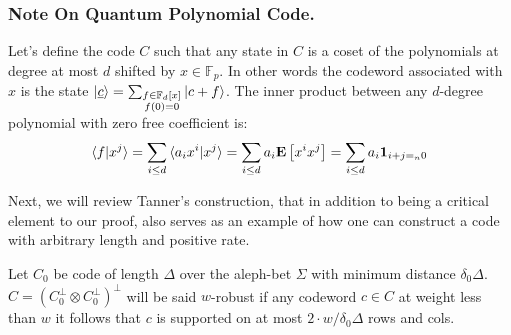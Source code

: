 \documentclass[manuscript,screen,review]{acmart}
\begin{document}
\subsubsection{Note On Quantum Polynomial Code.} 
Let's define the code $C$ such that any state in $C$ is a coset of the polynomials at degree at most $d$ shifted by $x \in \mathbb{F}_{p}$. In other words the codeword associated with $x$ is the state $\ket{\underline{c}} = \sum_{ \substack{ f \in \mathbb{F}_{d}[x] \\  f(0) = 0}}{ \ket{ c + f}} $. The inner product between any $d$-degree polynomial with zero free coefficient is:
\begin{equation*}
  \begin{split}
    \braket{ f | x^{j} } = \sum_{i \le d }{ \braket{a_{i} x^{i} | x^{j}}} = \sum_{i \le d}{ a_{i} \mathbf{E} \left[ { x^{i}x^{j}   } \right]} =  \sum_{i \le d}{ a_{i } \mathbf{1}_{ i + j =_{n} 0 }}
  \end{split}
\end{equation*}


Next, we will review Tanner's construction, that in addition to being a critical element to our proof, also serves as an example of how one can construct a code with arbitrary length and positive rate.


\begin{definition}[$w$-Robustness] Let $C_{0}$ be code of length $\Delta$ over the aleph-bet $\Sigma$ with minimum distance $\delta_{0}\Delta$. $C = \left(C_{0}^{\perp} \otimes C_{0}^{\perp}\right)^{\perp}$ will be said $w$-robust if any codeword $c \in C$ at weight less than $w$ it follows that $c$ is supported on at most $2\cdot w/\delta_{0}\Delta$ rows and cols.
\end{definition}


\printbibliography 
\end{document}
